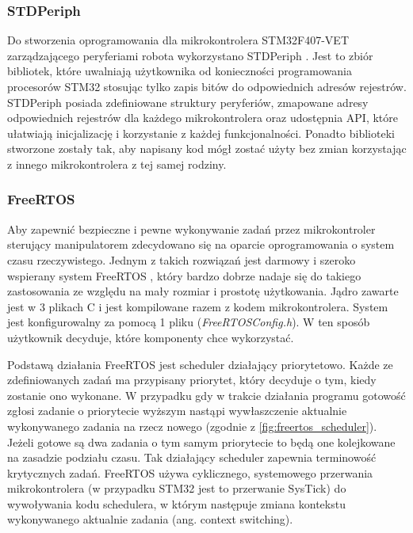 \documentclass[a4paper, 12pt, twoside]{article}
\begin{document}
\subsubsection{STDPeriph}

Do stworzenia oprogramowania dla mikrokontrolera STM32F407-VET zarządzającego peryferiami robota wykorzystano STDPeriph \cite{stdperiph}. Jest to zbiór bibliotek, które uwalniają użytkownika od konieczności programowania procesorów STM32 stosując tylko zapis bitów do odpowiednich adresów rejestrów. STDPeriph posiada zdefiniowane struktury peryferiów, zmapowane adresy odpowiednich rejestrów dla każdego mikrokontrolera oraz udostępnia API, które ułatwiają inicjalizację i korzystanie z każdej funkcjonalności. Ponadto biblioteki stworzone zostały tak, aby napisany kod mógł zostać użyty bez zmian korzystając z innego mikrokontrolera z tej samej rodziny.

\subsubsection{FreeRTOS}

Aby zapewnić bezpieczne i pewne wykonywanie zadań przez mikrokontroler sterujący manipulatorem zdecydowano się na oparcie oprogramowania o system czasu rzeczywistego. Jednym z takich rozwiązań jest darmowy i szeroko wspierany system FreeRTOS \cite{freertos}, który bardzo dobrze nadaje się do takiego zastosowania ze względu na mały rozmiar i prostotę użytkowania. Jądro zawarte jest w 3 plikach C i jest kompilowane razem z kodem mikrokontrolera. System jest konfigurowalny za pomocą 1 pliku (\textit{FreeRTOSConfig.h}). W ten sposób użytkownik decyduje, które komponenty chce wykorzystać.

Podstawą działania FreeRTOS jest scheduler działający priorytetowo. Każde ze zdefiniowanych zadań ma przypisany priorytet, który decyduje o tym, kiedy zostanie ono wykonane. W przypadku gdy w trakcie działania programu gotowość zgłosi zadanie o priorytecie wyższym nastąpi wywłaszczenie aktualnie wykonywanego zadania na rzecz nowego (zgodnie z \ref{fig:freertos_scheduler}). Jeżeli gotowe są dwa zadania o tym samym priorytecie to będą one kolejkowane na zasadzie podziału czasu. Tak działający scheduler zapewnia terminowość krytycznych zadań. FreeRTOS używa cyklicznego, systemowego przerwania mikrokontrolera (w przypadku STM32 jest to przerwanie SysTick) do wywoływania kodu schedulera, w którym następuje zmiana kontekstu wykonywanego aktualnie zadania (ang. context switching).
\end{document}

